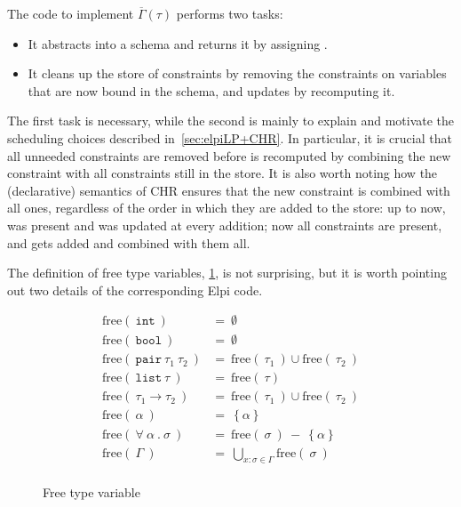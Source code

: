 \documentclass[a4paper, 11pt]{book}
\begin{document}
\noindent

The code to implement $\overline{\Gamma}(\tau)$ performs two tasks:

\begin{itemize}
  \item It abstracts  into a schema  and returns it by
    assigning .
  \item It cleans up the store of constraints by removing the 
    constraints on variables that are now bound in the schema, and updates
     by recomputing it.
\end{itemize}

The first task is necessary, while the second is mainly to explain and
motivate the scheduling choices described in~\cref{sec:elpiLP+CHR}. In
particular, it is crucial that all unneeded  constraints are
removed before  is recomputed by combining the new constraint
with all  constraints still in the store. It is also worth
noting how the (declarative) semantics of CHR ensures that the new
 constraint is combined with all  ones, regardless
of the order in which they are added to the store: up to now, 
was present and was updated at every  addition; now all
 constraints are present, and  gets added and
combined with them all.

The definition of free type variables, \cref{img:free}, is not surprising,
but it is worth pointing out two details of the corresponding Elpi code.

\begin{figure}
$$
\begin{array}{ll}
  \text{free}(\ \mathtt{int}\ ) &=\ \emptyset\\
  \text{free}(\ \mathtt{bool}\ ) &=\ \emptyset\\
  \text{free}(\ \mathtt{pair}\ \tau_1\ \tau_2\ ) &=\ \text{free}(\ \tau_1\ )\cup \text{free}(\ \tau_2\ ) \\
  \text{free}(\ \mathtt{list}\ \tau\ ) &=\ \text{free}(\ \tau ) \\
  \text{free}(\ \tau_1 \to \tau_2\ ) &=\ \text{free}(\ \tau_1\ )\cup \text{free}(\ \tau_2\ ) \\
  \text{free}(\ \alpha\ ) &=\ \left\{\alpha\right\}\\
  \text{free}(\ \forall\ \alpha\ .\ \sigma\ ) &=\ \text{free}(\ \sigma\ )\  -\  \left\{\alpha\right\}\\
  \text{free}(\ \Gamma\ ) &=\ \bigcup\limits_{x:\sigma \in \Gamma}\text{free}(\ \sigma\ )\\
\end{array}
$$
\caption{Free type variable\label{img:free}}
\end{figure}
\end{document}
